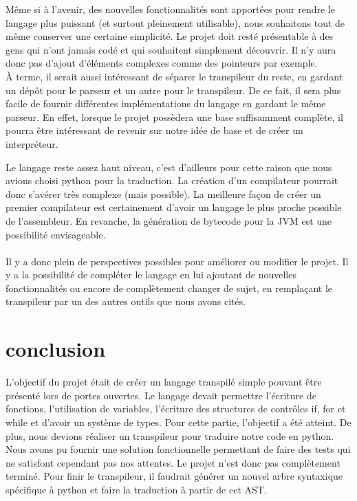 \documentclass[a4paper]{article}%
\begin{document}
Même si à l'avenir, des nouvelles fonctionnalités sont apportées pour rendre le
langage plus puissant (et surtout pleinement utilisable), nous souhaitons tout
de même conserver une certaine simplicité. Le projet doit resté présentable à
des gens qui n'ont jamais codé et qui souhaitent simplement découvrir. Il n'y
aura donc pas d'ajout d'éléments complexes comme des pointeurs par exemple.\\

À terme, il serait aussi intéressant de séparer le transpileur du reste, en
gardant un dépôt pour le parseur et un autre pour le transpileur. De ce fait, il
sera plus facile de fournir différentes implémentations du langage en gardant
le même parseur. En effet, lorsque le projet possèdera une base suffisamment
complète, il pourra être intéressant de revenir sur notre idée de base et de
créer un interpréteur.

Le langage reste assez haut niveau, c'est d'ailleurs pour cette raison que nous
avions choisi python pour la traduction. La création d'un compilateur pourrait
donc s'avérer très complexe (mais possible). La meilleure façon de créer un
premier compilateur est certainement d'avoir un langage le plus proche possible
de l'assembleur. En revanche, la génération de bytecode pour la JVM est une
possibilité envisageable.\\~\\

Il y a donc plein de perspectives possibles pour améliorer ou modifier le
projet. Il y a la possibilité de compléter le langage en lui ajoutant de
nouvelles fonctionnalités ou encore de complètement changer de sujet, en
remplaçant le transpileur par un des autres outils que nous avons cités.

\clearpage
\section*{conclusion}
\large

L'objectif du projet était de créer un langage transpilé simple pouvant être
présenté lors de portes ouvertes. Le langage devait permettre l'écriture de
fonctions, l'utilisation de variables, l'écriture des structures de contrôles
if, for et while et d'avoir un système de types. Pour cette partie, l'objectif a
été atteint. De plus, nous devions réaliser un transpileur pour traduire notre
code en python. Nous avons pu fournir une solution fonctionnelle permettant de
faire des tests qui ne satisfont cependant pas nos attentes. Le projet n'est
donc pas complètement terminé. Pour finir le transpileur, il faudrait générer un
nouvel arbre syntaxique spécifique à python et faire la traduction à partir de
cet AST.\\
\end{document}
